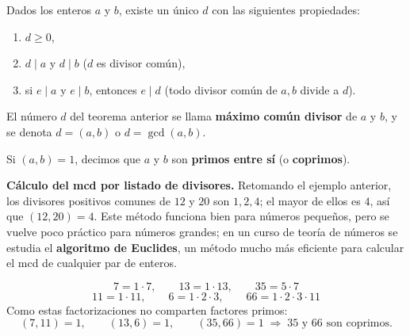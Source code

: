 \documentclass[12pt,a4paper]{book}
\begin{document}
  \begin{teorema}
    Dados los enteros $a$ y $b$, existe un único $d$ con las siguientes propiedades:
    \begin{enumerate}[label=\roman*)]
      \item $d \geq 0$,
      \item $d\mid a$ y $d\mid b$ ($d$ es divisor común),
      \item si $e\mid a$ y $e\mid b$, entonces $e\mid d$ (todo divisor común de $a,b$ divide a $d$).
    \end{enumerate}
  \end{teorema}
  
  \begin{definicion}
    El número $d$ del teorema anterior se llama \textbf{máximo común divisor} de $a$ y $b$, y se denota $d=(a,b)$ o $d=\gcd(a,b)$.
  \end{definicion}
  
  \begin{definicion}
    Si $(a,b)=1$, decimos que $a$ y $b$ son \textbf{primos entre sí} (o \textbf{coprimos}).
  \end{definicion}
  
  \begin{ejemplo}
    \textbf{Cálculo del mcd por listado de divisores.}
    Retomando el ejemplo anterior, los divisores positivos comunes de $12$ y $20$ son $1,2,4$; el mayor de ellos es $4$, así que $(12,20)=4$. Este método funciona bien para números pequeños, pero se vuelve poco práctico para números grandes; en un curso de teoría de números se estudia el \textbf{algoritmo de Euclides}, un método mucho más eficiente para calcular el mcd de cualquier par de enteros.
  \end{ejemplo}
  
  \begin{ejemplo}
    \begin{equation*}
      7=1\cdot 7, \qquad 13=1\cdot 13, \qquad 35=5\cdot 7
    \end{equation*}
    \begin{equation*}
      11=1\cdot 11, \qquad 6=1\cdot 2\cdot 3, \qquad 66=1\cdot 2\cdot 3\cdot 11
    \end{equation*}
    Como estas factorizaciones no comparten factores primos:
    \begin{equation*}
      (7,11)=1, \qquad (13,6)=1, \qquad (35,66)=1 \;\Longrightarrow\; 35 \text{ y } 66 \text{ son coprimos.}
    \end{equation*}
  \end{ejemplo}
  
\end{document}
